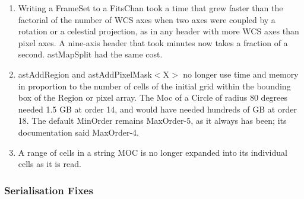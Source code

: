 \documentclass[twoside,11pt]{starlink}
\begin{document}
\begin{enumerate}
\item Writing a FrameSet to a FitsChan took a time that grew faster than the factorial of the number of WCS axes when two axes were coupled by a rotation or a celestial projection, as in any header with more WCS axes than pixel axes.
  A nine-axis header that took minutes now takes a fraction of a second.
  astMapSplit had the same cost.
\item astAddRegion and astAddPixelMask$<$X$>$ no longer use time and memory in proportion to the number of cells of the initial grid within the bounding box of the Region or pixel array.
  The Moc of a Circle of radius 80 degrees needed 1.5 GB at order 14, and would have needed hundreds of GB at order 18.
  The default MinOrder remains MaxOrder-5, as it always has been; its documentation said MaxOrder-4.
\item A range of cells in a string MOC is no longer expanded into its individual cells as it is read.
\end{enumerate}

\subsubsection{Serialisation Fixes}
\end{document}
